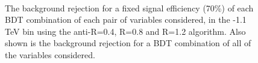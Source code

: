 \begin{figure}
\begin{center}
\\
\caption{The background rejection
for a fixed signal efficiency (70\%) of each BDT combination of
each pair of variables considered, in the -1.1 TeV bin using
the anti-\kT R=0.4, R=0.8 and R=1.2 algorithm. Also shown is the background rejection
for a BDT combination of all of the variables considered.}
\label{fig:pt1000_comb2D}
\end{center}
\end{figure}


